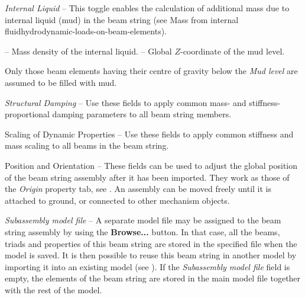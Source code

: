 \begin{bulletlist}
\item{\sl Internal Liquid} --
  This toggle enables the calculation of additional mass due to internal liquid
  (mud) in the beam string (see 
  {Mass from internal fluid}{hydrodynamic-loads-on-beam-elements}).

  \begin{itemize}
   -- Mass density of the internal liquid.
   -- Global $Z$-coordinate of the mud level.
  \end{itemize}
  Only those beam elements having their centre of gravity below the
  {\sl Mud level} are assumed to be filled with mud.

\item{\sl Structural Damping} --
  Use these fields to apply common mass- and stiffness-proportional damping
  parameters to all beam string members.

\item{Scaling of Dynamic Properties} --
  Use these fields to apply common stiffness and mass scaling to all beams
  in the beam string.


\item{Position and Orientation} --
  These fields can be used to adjust the global position of the beam string
  assembly after it has been imported.
  They work as those of the {\sl Origin} property tab, see
  .
  An assembly can be moved freely until it is attached to ground,
  or connected to other mechanism objects.

\item{\sl Subassembly model file} --
  A separate model file may be assigned to the beam string assembly by using the
  \textbf{Browse...} button. In that case, all the beams, triads and properties
  of this beam string are stored in the specified file when the model is saved.
  It is then possible to reuse this beam string in another model
  by importing it into an existing model
  (see ).
  If the {\sl Subassembly model file} field is empty, the elements of the beam
  string are stored in the main model file together with the rest of the model.
\end{bulletlist}


